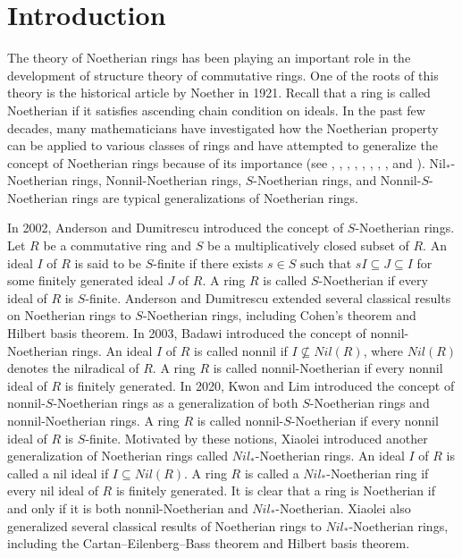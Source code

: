 \documentclass[11pt]{article}
\begin{document}
\section{Introduction}
The theory of Noetherian rings has been playing an important role in the development of structure theory of commutative rings. One of the roots of this theory is the historical article \cite{ne21} by Noether in 1921. Recall that a ring is called  Noetherian if it satisfies ascending chain condition on ideals. In the past few decades, many mathematicians have investigated how the Noetherian property can be applied to various classes of rings and have attempted to generalize the concept of Noetherian rings because of its importance (see \cite{ah18}, \cite{ad02}, \cite{badawi03}, \cite{jw16},  \cite{zb17}, \cite{nonnil20}, \cite{ts23}, \cite{ts24}, and \cite{ts25}).  Nil$_{*}$-Noetherian rings,  Nonnil-Noetherian rings, $S$-Noetherian rings, and Nonnil-$S$-Noetherian rings are typical generalizations of Noetherian rings.

  
  
  In 2002, Anderson and Dumitrescu \cite{ad02} introduced the concept of $S$-Noetherian rings. Let $R$ be a commutative ring and $S$ be a multiplicatively closed subset of $R$. An ideal $I$ of $R$ is said to be $S$-finite if there exists $s \in S$ such that $sI \subseteq J \subseteq I$ for some finitely generated ideal $J$ of $R$. A ring $R$ is called $S$-Noetherian if every ideal of $R$ is $S$-finite. Anderson and Dumitrescu extended several classical results on Noetherian rings to $S$-Noetherian rings, including Cohen's theorem and Hilbert basis theorem.
  In 2003, Badawi \cite{badawi03} introduced the concept of nonnil-Noetherian rings. An ideal $I$ of $R$ is called nonnil if $I \nsubseteq Nil(R)$, where $Nil(R)$ denotes the nilradical of $R$. A ring $R$ is called nonnil-Noetherian if every nonnil ideal of $R$ is finitely generated. 
   In 2020, Kwon and Lim \cite{nonnil20} introduced the concept of nonnil-$S$-Noetherian rings as a generalization of both $S$-Noetherian rings and nonnil-Noetherian rings. A ring $R$ is called nonnil-$S$-Noetherian if every nonnil ideal of $R$ is $S$-finite.
  Motivated by these notions, Xiaolei \cite{zx22} introduced another generalization of Noetherian rings called $Nil_{*}$-Noetherian rings. An ideal $I$ of $R$ is called a nil ideal if $I \subseteq Nil(R)$. A ring $R$ is called a $Nil_{*}$-Noetherian ring if every nil ideal of $R$ is finitely generated. It is clear that a ring is Noetherian if and only if it is both nonnil-Noetherian and $Nil_{*}$-Noetherian. Xiaolei also generalized several classical results of Noetherian rings to $Nil_{*}$-Noetherian rings, including the Cartan--Eilenberg--Bass theorem and Hilbert basis theorem.
  
\end{document}
